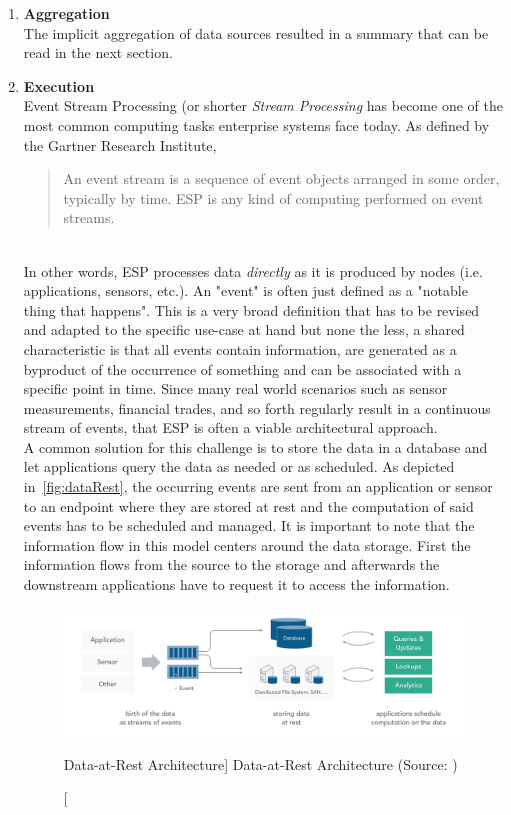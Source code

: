 \begin{enumerate}
    \item
    \textbf{Aggregation}\\
    The implicit aggregation of data sources resulted in a summary that can be read in the next section.
    
    \item
    \textbf{Execution}\\
    Event Stream Processing (or shorter \textit{Stream Processing} has become one of the most common computing tasks enterprise systems face today. As defined by the Gartner Research Institute,
    \blockquote{An event stream is a sequence of event objects arranged in some order, typically by time. \acf{ESP} is any kind of computing performed on event streams.}\autocite{Schulte2017TechnologyProcessing}\\
    In other words, \acf{ESP} processes data \textit{directly} as it is produced by nodes (i.e. applications, sensors, etc.). An "event" is often just defined as a "notable thing that happens".\autocite{Group2006Event-DrivenOverview} This is a very broad definition that has to be revised and adapted to the specific use-case at hand but none the less, a shared characteristic is that all events contain information, are generated as a byproduct of the occurrence of something and can be associated with a specific point in time. 
    Since many real world scenarios such as sensor measurements, financial trades, and so forth regularly result in a continuous stream of events, that \acf{ESP} is often a viable architectural approach.\\
    A common solution for this challenge is to store the data in a database and let applications query the data as needed or as scheduled. As depicted in~\vref{fig:dataRest}, the occurring events are sent from an application or sensor to an endpoint where they are stored at rest and the computation of said events has to be scheduled and managed. It is important to note that the information flow in this model centers around the data storage. First the information flows from the source to the storage and afterwards the downstream applications have to request it to access the information.
    
    \begin{figure}[ht]
        \includegraphics[width=\linewidth]{images/streaming/data_at_rest.png}\centering
        \caption
        [Data-at-Rest Architecture]
        {Data-at-Rest Architecture (Source: \cite{dataArtisans2017WhatProcessing})}
        \label{fig:dataRest}
    \end{figure}
    

\end{enumerate}
